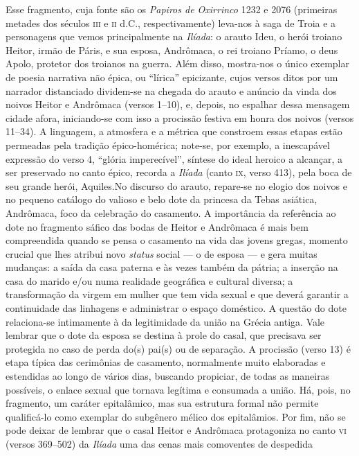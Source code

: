 {\small Esse fragmento, cuja fonte são os \textit{Papiros de Oxirrinco} 1232 e 2076
(primeiras metades dos séculos \textsc{iii} e \textsc{ii} d.C., respectivamente) leva-nos à saga
de Troia e a personagens que vemos principalmente na \textit{Ilíada}: o arauto
Ideu, o herói troiano Heitor, irmão de Páris, e sua esposa, Andrômaca, o rei
troiano Príamo, o deus Apolo, protetor dos troianos na guerra. Além disso,
mostra-nos o único exemplar de poesia narrativa não épica, ou “lírica”
epicizante, cujos versos ditos por um narrador distanciado dividem-se na
chegada do arauto e anúncio da vinda dos noivos Heitor e Andrômaca (versos
1--10), e, depois, no espalhar dessa mensagem cidade afora, iniciando-se com
isso a procissão festiva em honra dos noivos (versos 11--34). A linguagem, a
atmosfera e a métrica que constroem essas etapas estão permeadas pela tradição
épico-homérica; note-se, por exemplo, a inescapável expressão do verso 4,
``glória imperecível”, síntese do ideal heroico a alcançar, a
ser preservado no canto épico, recorda a \textit{Ilíada }(canto \textsc{ix}, verso 413),
pela boca de seu grande herói, Aquiles.No discurso do arauto, repare-se no
elogio dos noivos e no pequeno catálogo do valioso e belo dote da princesa da
Tebas asiática, Andrômaca, foco da celebração do casamento. A importância da
referência ao dote no fragmento sáfico das bodas de Heitor e Andrômaca é mais
bem compreendida quando se pensa o casamento na vida das jovens gregas, momento
crucial que lhes atribui novo \textit{status} social --- o de esposa --- e gera
muitas mudanças: a saída da casa paterna e às vezes também da pátria; a
inserção na casa do marido e/ou numa realidade geográfica e cultural diversa; a
transformação da virgem em mulher que tem vida sexual e que deverá garantir a
continuidade das linhagens e administrar o espaço doméstico. A questão do dote
relaciona-se intimamente à da legitimidade da união na Grécia antiga. Vale
lembrar que o dote da esposa se destina à prole do casal, que precisava ser
protegida no caso de perda do(s) pai(s) ou de separação. A procissão (verso
13) é etapa típica das cerimônias de casamento, normalmente muito elaboradas e
estendidas ao longo de vários dias, buscando propiciar, de todas as maneiras
possíveis, o enlace sexual que tornava legítima e consumada a união. Há, pois,
no fragmento, um caráter epitalâmico, mas sua estrutura formal não permite
qualificá-lo como exemplar do subgênero mélico dos epitalâmios. Por fim, não se
pode deixar de lembrar que o casal Heitor e Andrômaca protagoniza no canto \textsc{vi}
(versos 369--502) da \textit{Ilíada }uma das cenas mais comoventes de despedida
}
